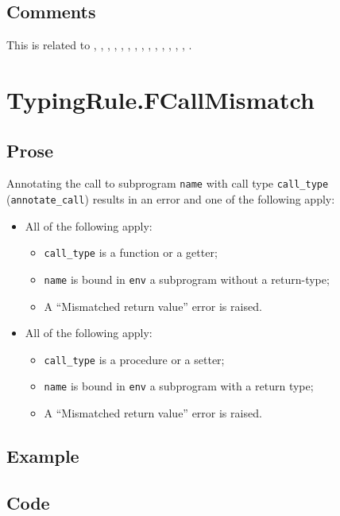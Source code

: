 \documentclass{book}
\begin{document}
\subsection{Comments}
  This is related to , , ,
  , , , , ,
  , , , , ,
  , .

\section{TypingRule.FCallMismatch \label{sec:TypingRule.FCallMismatch}}

  \subsection{Prose}
  Annotating the call to subprogram \texttt{name} with call type \texttt{call\_type} \\ (\texttt{annotate\_call}) results in an error and
  one of the following apply:
  \begin{itemize}
    \item All of the following apply: \begin{itemize} \item \texttt{call\_type}
          is a function or a getter;
        \item \texttt{name} is bound in \texttt{env} a subprogram without a return-type;
        \item A ``Mismatched return value'' error is raised.
      \end{itemize}
    \item All of the following apply:
      \begin{itemize}
        \item \texttt{call\_type} is a procedure or a setter;
        \item \texttt{name} is bound in \texttt{env} a subprogram with a return type;
        \item A ``Mismatched return value'' error is raised.
      \end{itemize}
  \end{itemize}

  \subsection{Example}

  \subsection{Code}
\end{document}
